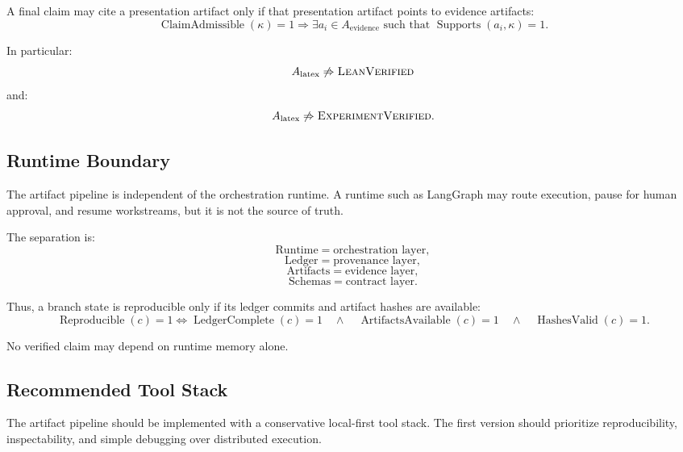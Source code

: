 \documentclass[11pt]{article}
\begin{document}
A final claim may cite a presentation artifact only if that presentation artifact points to evidence artifacts:
$$
\operatorname{ClaimAdmissible}(\kappa)=1 \Rightarrow \exists a_i\in A_{\text{evidence}} \text{ such that } \operatorname{Supports}(a_i,\kappa)=1.
$$

In particular:
$$
A_{\text{latex}} \not\Rightarrow \textsc{LeanVerified}
$$
and:
$$
A_{\text{latex}} \not\Rightarrow \textsc{ExperimentVerified}.
$$

\subsection{Runtime Boundary}

The artifact pipeline is independent of the orchestration runtime. A runtime such as LangGraph may route execution, pause for human approval, and resume workstreams, but it is not the source of truth.

The separation is:
$$
\text{Runtime}=\text{orchestration layer},
$$
$$
\text{Ledger}=\text{provenance layer},
$$
$$
\text{Artifacts}=\text{evidence layer},
$$
$$
\text{Schemas}=\text{contract layer}.
$$

Thus, a branch state is reproducible only if its ledger commits and artifact hashes are available:
$$
\operatorname{Reproducible}(c)=1 \Longleftrightarrow \operatorname{LedgerComplete}(c)=1 \quad\wedge\quad \operatorname{ArtifactsAvailable}(c)=1 \quad\wedge\quad \operatorname{HashesValid}(c)=1.
$$

No verified claim may depend on runtime memory alone.

\subsection{Recommended Tool Stack}

The artifact pipeline should be implemented with a conservative local-first tool stack. The first version should prioritize reproducibility, inspectability, and simple debugging over distributed execution.
\end{document}
